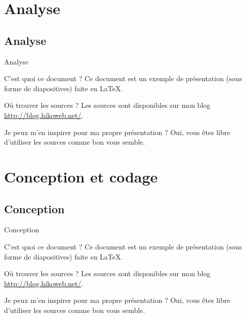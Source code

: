 \documentclass[utf8,compress]{beamer}
\begin{document}
\section{Analyse}
\subsection{Analyse}
\begin{frame}{Analyse}
\begin{block}{C'est quoi ce document ?}
    Ce document est un exemple de présentation (sous forme de diapositives) faite en LaTeX.
\end{block}
\begin{block}{Où trouver les sources ?}
    Les sources sont disponibles sur mon blog \url{http://blog.hikoweb.net/}.
\end{block}
\begin{block}{Je peux m'en inspirer pour ma propre présentation ?}
    Oui, vous êtes libre d'utiliser les sources comme bon vous semble.
\end{block}
\end{frame}

\section{Conception et codage}
\subsection{Conception}
\begin{frame}{Conception}
\begin{block}{C'est quoi ce document ?}
    Ce document est un exemple de présentation (sous forme de diapositives) faite en LaTeX.
\end{block}
\begin{block}{Où trouver les sources ?}
    Les sources sont disponibles sur mon blog \url{http://blog.hikoweb.net/}.
\end{block}
\begin{block}{Je peux m'en inspirer pour ma propre présentation ?}
    Oui, vous êtes libre d'utiliser les sources comme bon vous semble.
\end{block}
\end{frame}
\end{document}
